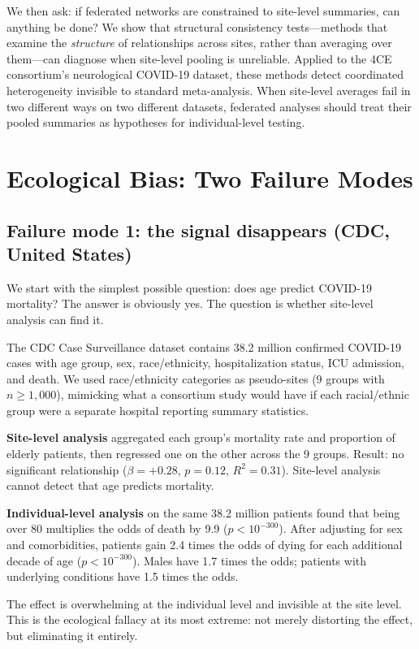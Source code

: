 \documentclass{article}
\begin{document}
We then ask: if federated networks are constrained to site-level summaries,
can anything be done?  We show that structural consistency tests---methods
that examine the \emph{structure} of relationships across sites, rather than
averaging over them---can diagnose when site-level pooling is unreliable.
Applied to the 4CE consortium's neurological COVID-19 dataset, these methods
detect coordinated heterogeneity invisible to standard meta-analysis.  When
site-level averages fail in two different ways on two different datasets,
federated analyses should treat their pooled summaries as hypotheses for
individual-level testing.


\section{Ecological Bias: Two Failure Modes}

\subsection{Failure mode 1: the signal disappears (CDC, United States)}

We start with the simplest possible question: does age predict COVID-19
mortality?  The answer is obviously yes.  The question is whether site-level
analysis can find it.

The CDC Case Surveillance dataset contains 38.2 million confirmed COVID-19
cases with age group, sex, race/ethnicity, hospitalization status, ICU
admission, and death.  We used race/ethnicity categories as pseudo-sites (9
groups with $n \geq 1{,}000$), mimicking what a consortium study would have
if each racial/ethnic group were a separate hospital reporting summary
statistics.

\textbf{Site-level analysis} aggregated each group's mortality rate and
proportion of elderly patients, then regressed one on the other across the 9
groups.  Result: no significant relationship ($\beta = +0.28$, $p = 0.12$,
$R^2 = 0.31$).  Site-level analysis cannot detect that age predicts mortality.

\textbf{Individual-level analysis} on the same 38.2 million patients found
that being over 80 multiplies the odds of death by 9.9 ($p < 10^{-300}$).
After adjusting for sex and comorbidities, patients gain 2.4 times the odds of
dying for each additional decade of age ($p < 10^{-300}$).  Males have 1.7
times the odds; patients with underlying conditions have 1.5 times the odds.

The effect is overwhelming at the individual level and invisible at the site
level.  This is the ecological fallacy at its most extreme: not merely
distorting the effect, but eliminating it entirely.
\end{document}
